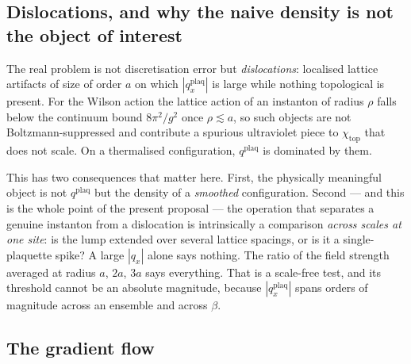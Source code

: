 \documentclass[11pt,a4paper]{article}
\begin{document}
\subsection{Dislocations, and why the naive density is not the object of interest}

The real problem is not discretisation error but \emph{dislocations}: localised
lattice artifacts of size of order $a$ on which $|q^{\mathrm{plaq}}_x|$ is large
while nothing topological is present. For the Wilson action the lattice action of
an instanton of radius $\rho$ falls below the continuum bound $8\pi^2/g^2$ once
$\rho \lesssim a$, so such objects are not Boltzmann-suppressed and contribute a
spurious ultraviolet piece to $\chi_{\mathrm{top}}$ that does not scale. On a
thermalised configuration, $q^{\mathrm{plaq}}$ is dominated by them.

This has two consequences that matter here. First, the physically meaningful
object is not $q^{\mathrm{plaq}}$ but the density of a \emph{smoothed}
configuration. Second --- and this is the whole point of the present proposal ---
the operation that separates a genuine instanton from a dislocation is
intrinsically a comparison \emph{across scales at one site}: is the lump extended
over several lattice spacings, or is it a single-plaquette spike? A large
$|q_x|$ alone says nothing. The ratio of the field strength averaged at radius
$a$, $2a$, $3a$ says everything. That is a scale-free test, and its threshold
cannot be an absolute magnitude, because $|q^{\mathrm{plaq}}_x|$ spans orders of
magnitude across an ensemble and across $\beta$.

\subsection{The gradient flow}
\end{document}
